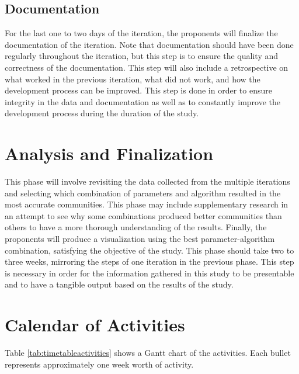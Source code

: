 \subsection{Documentation}

For the last one to two days of the iteration, the proponents will finalize the documentation of the iteration. Note that documentation should have been done regularly throughout the iteration, but this step is to ensure the quality and correctness of the documentation. This step will also include a retrospective on what worked in the previous iteration, what did not work, and how the development process can be improved. This step is done in order to ensure integrity in the data and documentation as well as to constantly improve the development process during the duration of the study.

\section{Analysis and Finalization}

This phase will involve revisiting the data collected from the multiple iterations and selecting which combination of parameters and algorithm resulted in the most accurate communities. This phase may include supplementary research in an attempt to see why some combinations produced better communities than others to have a more thorough understanding of the results. Finally, the proponents will produce a visualization using the best parameter-algorithm combination, satisfying the objective of the study. This phase should take two to three weeks, mirroring the steps of one iteration in the previous phase. This step is necessary in order for the information gathered in this study to be presentable and to have a tangible output based on the results of the study.

\section{Calendar of Activities}

Table \ref{tab:timetableactivities} shows a Gantt chart of the activities.  Each bullet represents approximately
one week worth of activity.

%
%
\newcommand{\weekone}{\textbullet}
\newcommand{\weektwo}{\textbullet \textbullet}
\newcommand{\weekthree}{\textbullet \textbullet \textbullet}
\newcommand{\weekfour}{\textbullet \textbullet \textbullet \textbullet}

